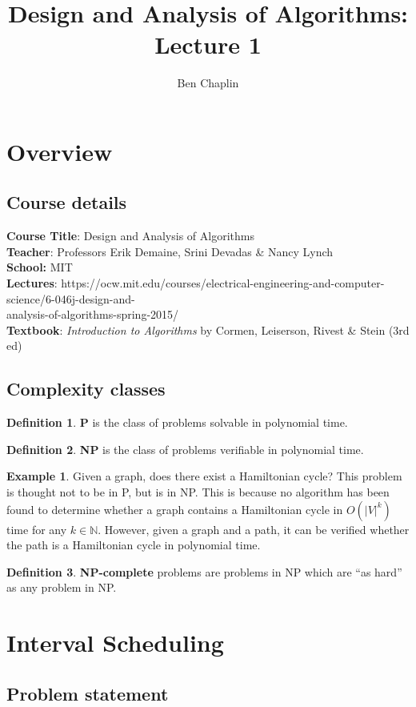 \documentclass[11pt]{article}
\title{Design and Analysis of Algorithms: Lecture 1}
\author{Ben Chaplin}
\date{}
\theoremstyle{plain}
\theoremstyle{definition}
\newtheorem*{defn}{Definition}
\newtheorem*{ex}{Example}
\newcommand{\N}{\mathbb{N}}
\begin{document}
\maketitle
\tableofcontents

\section{Overview}
\subsection{Course details}

{\bf Course Title}: Design and Analysis of Algorithms\\
{\bf Teacher}: Professors Erik Demaine, Srini Devadas \& Nancy Lynch\\
{\bf School:} MIT\\ 
{\bf Lectures}: https://ocw.mit.edu/courses/electrical-engineering-and-computer-science/6-046j-design-and-\\
analysis-of-algorithms-spring-2015/\\
{\bf Textbook}: {\it Introduction to Algorithms} by Cormen, Leiserson, Rivest \& Stein (3rd ed) 

\subsection{Complexity classes}

\begin{defn}
    {\bf P} is the class of problems solvable in polynomial time.
\end{defn}

\begin{defn}
    {\bf NP} is the class of problems verifiable in polynomial time.
\end{defn}

\begin{ex}
    Given a graph, does there exist a Hamiltonian cycle? This problem is thought not to be in P,
    but is in NP. This is because no algorithm has been found to determine whether a graph contains a Hamiltonian
    cycle in $O(|V|^k)$ time for any $k \in \N$. However, given a graph and a path, it can be verified
    whether the path is a Hamiltonian cycle in polynomial time.
\end{ex}

\begin{defn}
    {\bf NP-complete} problems are problems in NP which are ``as hard'' as any problem in NP.
\end{defn}

\section{Interval Scheduling}
\subsection{Problem statement}
\end{document}
